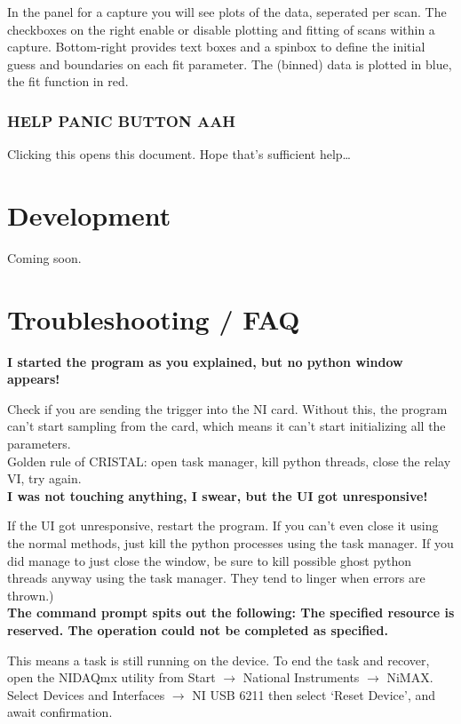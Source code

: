 \documentclass[10pt,a4paper]{article}
\begin{document}
In the panel for a capture you will see plots of the data, seperated per scan. The checkboxes on the right enable or disable plotting and fitting of scans within a capture. Bottom-right provides text boxes and a spinbox to define the initial guess and boundaries on each fit parameter. The (binned) data is plotted in blue, the fit function in red.

\subsubsection{HELP PANIC BUTTON AAH}

Clicking this opens this document. Hope that's sufficient help\ldots


\section{Development}

Coming soon.

\section{Troubleshooting / FAQ}


\textbf{I started the program as you explained, but no python window appears!}

Check if you are sending the trigger into the NI card. Without this, the program can't start sampling from the card, which means it can't start initializing all the parameters.\\

Golden rule of CRISTAL: open task manager, kill python threads, close the relay VI, try again.\\

\textbf{I was not touching anything, I swear, but the UI got unresponsive!}

If the UI got unresponsive, restart the program. If you can't even close it using the normal methods, just kill the python processes using the task manager. If you did manage to just close the window, be sure to kill possible ghost python threads anyway using the task manager. They tend to linger when errors are thrown.) \\


\textbf{The command prompt spits out the following: The specified resource is reserved. The operation could not be completed as specified.}

This means a task is still running on the device. To end the task and recover, open the NIDAQmx utility from Start $\rightarrow$ National Instruments $\rightarrow$ NiMAX. Select Devices and Interfaces $\rightarrow$ NI USB 6211 then select `Reset Device', and await confirmation.\\
\end{document}

